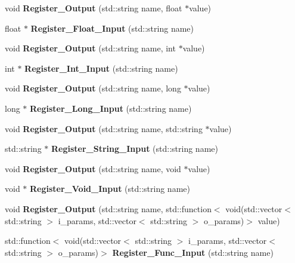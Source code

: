 \begin{DoxyCompactItemize}
void {\bfseries Register\+\_\+\+Output} (std\+::string name, float $\ast$value)
\item 
\mbox{\label{class_shared___memory_ac1eba064511b1dc5ae2927c0bd683762}} 
float $\ast$ {\bfseries Register\+\_\+\+Float\+\_\+\+Input} (std\+::string name)
\item 
\mbox{\label{class_shared___memory_aa6e367a3e1076e8e392e1a4291de3062}} 
void {\bfseries Register\+\_\+\+Output} (std\+::string name, int $\ast$value)
\item 
\mbox{\label{class_shared___memory_a7000ec66a0d8679b91d78535e65974f5}} 
int $\ast$ {\bfseries Register\+\_\+\+Int\+\_\+\+Input} (std\+::string name)
\item 
\mbox{\label{class_shared___memory_a894da19d9977b3e7618ad22e68964666}} 
void {\bfseries Register\+\_\+\+Output} (std\+::string name, long $\ast$value)
\item 
\mbox{\label{class_shared___memory_a51d5425a6a2557bca0463cb8d28a7a54}} 
long $\ast$ {\bfseries Register\+\_\+\+Long\+\_\+\+Input} (std\+::string name)
\item 
\mbox{\label{class_shared___memory_a0a7cc51cffb7dde7fdcbab18b32defec}} 
void {\bfseries Register\+\_\+\+Output} (std\+::string name, std\+::string $\ast$value)
\item 
\mbox{\label{class_shared___memory_a45ffc5e30b6d680faf99a02fadbfe09a}} 
std\+::string $\ast$ {\bfseries Register\+\_\+\+String\+\_\+\+Input} (std\+::string name)
\item 
\mbox{\label{class_shared___memory_a9a1859f2488f225234e86d3da2654c65}} 
void {\bfseries Register\+\_\+\+Output} (std\+::string name, void $\ast$value)
\item 
\mbox{\label{class_shared___memory_a6a75d34f8611b57e8c5ee0708cc8c4e6}} 
void $\ast$ {\bfseries Register\+\_\+\+Void\+\_\+\+Input} (std\+::string name)
\item 
\mbox{\label{class_shared___memory_a5d0f14cd98f9cd12040d859560cb4d1a}} 
void {\bfseries Register\+\_\+\+Output} (std\+::string name, std\+::function$<$ void(std\+::vector$<$ std\+::string $>$ i\+\_\+params, std\+::vector$<$ std\+::string $>$ o\+\_\+params)$>$ value)
\item 
\mbox{\label{class_shared___memory_a14c12d9dda3a4693c7589baeec1f4ca9}} 
std\+::function$<$ void(std\+::vector$<$ std\+::string $>$ i\+\_\+params, std\+::vector$<$ std\+::string $>$ o\+\_\+params)$>$ {\bfseries Register\+\_\+\+Func\+\_\+\+Input} (std\+::string name)
\end{DoxyCompactItemize}

